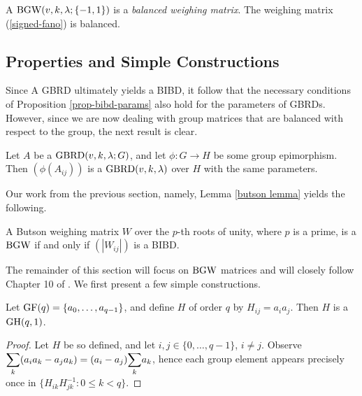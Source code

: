 \documentclass[../../../main]{subfiles}
\begin{document}
 \begin{ex}
  A $\text{BGW}(v,k,\lambda;\{-1,1\})$ is a {\it balanced weighing matrix}. The weighing matrix (\ref{signed-fano}) is balanced.
 \end{ex}
 
 \dinkus
 
 \subsection{Properties and Simple Constructions}
 
 Since A GBRD ultimately yields a BIBD, it follow that the necessary conditions of Proposition \ref{prop-bibd-params} also hold for the parameters of GBRDs. However, since we are now dealing with group matrices that are balanced with respect to the group, the next result is clear.
 
 \begin{prop}\label{gbrd epimorphism}
  Let $A$ be a $\text{GBRD}(v,k,\lambda;G)$, and let $\phi: G \rightarrow H$ be some group epimorphism. Then $(\phi(A_{ij}))$ is a $\text{GBRD}(v,k,\lambda)$ over $H$ with the same parameters.
 \end{prop}
 
 Our work from the previous section, namely, Lemma \ref{butson lemma} yields the following.
 
 \begin{prop}
  A Butson weighing matrix $W$ over the $p$-th roots of unity, where $p$ is a prime, is a $\text{BGW}$ if and only if $(|W_{ij}|)$ is a BIBD.
 \end{prop}
 
 The remainder of this section will focus on $\text{BGW}$ matrices and will closely follow Chapter 10 of \cite{combinatorics-of-symmetric-designs}. We first present a few simple constructions.
 
 \begin{prop}\label{gh proposition}
  Let $\text{GF}(q) = \{a_0, \dots, a_{q-1}\}$, and define $H$ of order $q$ by $H_{ij} = a_ia_j$. Then $H$ is a $\text{GH}(q,1)$.
 \end{prop}
 
 \begin{proof}
  Let $H$ be so defined, and let $i,j \in \{0,\dots,q-1\}$, $i \neq j$. Observe $\ssum_k (a_ia_k - a_ja_k) = (a_i - a_j)\ssum_k a_k$, hence each group element appears precisely once in $\{H_{ik}H_{jk}^{-1} : 0 \leq k < q\}$.
 \end{proof}
\end{document}
